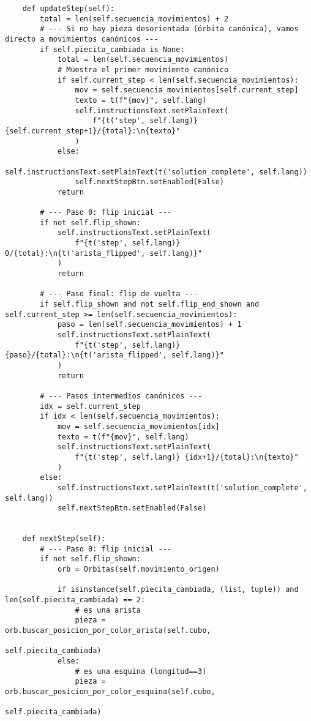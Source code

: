\begin{lstlisting}
    def updateStep(self):
        total = len(self.secuencia_movimientos) + 2
        # --- Si no hay pieza desorientada (órbita canónica), vamos directo a movimientos canónicos ---
        if self.piecita_cambiada is None:
            total = len(self.secuencia_movimientos)
            # Muestra el primer movimiento canónico
            if self.current_step < len(self.secuencia_movimientos):
                mov = self.secuencia_movimientos[self.current_step]
                texto = t(f"{mov}", self.lang)
                self.instructionsText.setPlainText(
                    f"{t('step', self.lang)} {self.current_step+1}/{total}:\n{texto}"
                )
            else:
                self.instructionsText.setPlainText(t('solution_complete', self.lang))
                self.nextStepBtn.setEnabled(False)
            return

        # --- Paso 0: flip inicial ---
        if not self.flip_shown:
            self.instructionsText.setPlainText(
                f"{t('step', self.lang)} 0/{total}:\n{t('arista_flipped', self.lang)}"
            )
            return

        # --- Paso final: flip de vuelta ---
        if self.flip_shown and not self.flip_end_shown and self.current_step >= len(self.secuencia_movimientos):
            paso = len(self.secuencia_movimientos) + 1
            self.instructionsText.setPlainText(
                f"{t('step', self.lang)} {paso}/{total}:\n{t('arista_flipped', self.lang)}"
            )
            return

        # --- Pasos intermedios canónicos ---
        idx = self.current_step
        if idx < len(self.secuencia_movimientos):
            mov = self.secuencia_movimientos[idx]
            texto = t(f"{mov}", self.lang)
            self.instructionsText.setPlainText(
                f"{t('step', self.lang)} {idx+1}/{total}:\n{texto}"
            )
        else:
            self.instructionsText.setPlainText(t('solution_complete', self.lang))
            self.nextStepBtn.setEnabled(False)

            
    def nextStep(self):
        # --- Paso 0: flip inicial ---
        if not self.flip_shown:
            orb = Orbitas(self.movimiento_origen)

            if isinstance(self.piecita_cambiada, (list, tuple)) and len(self.piecita_cambiada) == 2:
                # es una arista
                pieza = orb.buscar_posicion_por_color_arista(self.cubo,
                                                            self.piecita_cambiada)
            else:
                # es una esquina (longitud==3)
                pieza = orb.buscar_posicion_por_color_esquina(self.cubo,
                                                            self.piecita_cambiada)


\end{lstlisting}
